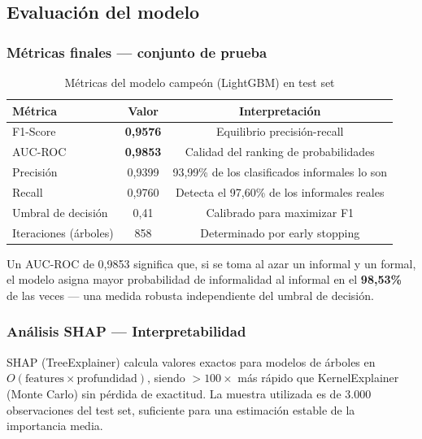 \documentclass[12pt, a4paper]{article}
\begin{document}
\subsection{Evaluación del modelo}

\subsubsection{Métricas finales — conjunto de prueba}

\begin{table}[H]
\centering
\caption{Métricas del modelo campeón (LightGBM) en test set}
\label{tab:metricas_final}
\begin{tabular}{lcc}
\toprule
\textbf{Métrica} & \textbf{Valor} & \textbf{Interpretación} \\
\midrule
F1-Score & \textbf{0{,}9576} & Equilibrio precisión-recall \\
AUC-ROC & \textbf{0{,}9853} & Calidad del ranking de probabilidades \\
Precisión & 0{,}9399 & 93{,}99\% de los clasificados informales lo son \\
Recall & 0{,}9760 & Detecta el 97{,}60\% de los informales reales \\
Umbral de decisión & 0{,}41 & Calibrado para maximizar F1 \\
Iteraciones (árboles) & 858 & Determinado por early stopping \\
\bottomrule
\end{tabular}
\end{table}

Un AUC-ROC de 0{,}9853 significa que, si se toma al azar un informal y un formal,
el modelo asigna mayor probabilidad de informalidad al informal en el \textbf{98{,}53\%}
de las veces — una medida robusta independiente del umbral de decisión.

\subsubsection{Análisis SHAP — Interpretabilidad}

SHAP (TreeExplainer) calcula valores exactos para modelos de árboles en
$O(\text{features} \times \text{profundidad})$, siendo $>100\times$ más rápido que
KernelExplainer (Monte Carlo) sin pérdida de exactitud. La muestra utilizada es de
3.000 observaciones del test set, suficiente para una estimación estable de la
importancia media.
\end{document}
